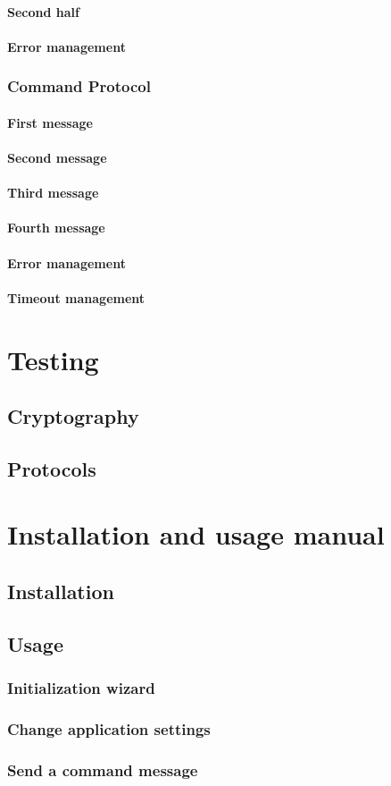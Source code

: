 \documentclass[a4paper,12pt]{article}
\begin{document}
\paragraph{Second half}
\paragraph{Error management}
\subsubsection{Command Protocol}
\paragraph{First message}
\paragraph{Second message}
\paragraph{Third message}
\paragraph{Fourth message}
\paragraph{Error management}
\paragraph{Timeout management}

\noindent
\Huge{\section{Testing}}
\subsection{Cryptography}
\subsection{Protocols}
\clearpage

\noindent
\Huge{\section{Installation and usage manual}}
\subsection{Installation}
\subsection{Usage}
\subsubsection{Initialization wizard}
\subsubsection{Change application settings}
\subsubsection{Send a command message}
\clearpage
\end{document}
